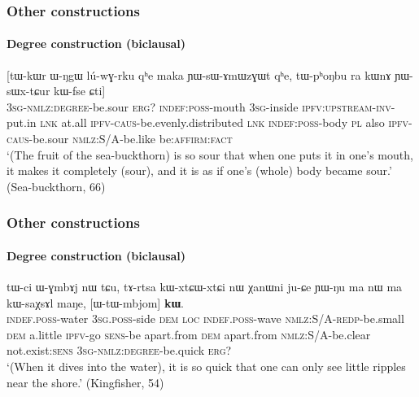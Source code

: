 \documentclass[xcolor=table]{beamer}
\newcommand{\ipa}[1]{{\phon \mbox{#1}}} %
\begin{document}
  \begin{frame} 
 \frametitle{Other constructions} 
 \framesubtitle{Degree construction (biclausal)} 
\begin{exe}
\ex \label{ex:YWsWxtCur2}
\gll 
 	[\ipa{ɯ-tɯ-tɕur}]  	\ipa{\textbf{kɯ}}  	[\ipa{tɯ-kɯr}  	\ipa{ɯ-ŋgɯ}  	\ipa{lú-wɣ-rku}  	\ipa{qʰe}  	\ipa{maka}  	\ipa{ɲɯ-sɯ-ɤmɯzɣɯt}  	\ipa{qʰe,}  	\ipa{tɯ-pʰoŋbu}  	\ipa{ra}  	\ipa{kɯnɤ}  	\ipa{ɲɯ-sɯx-tɕur}  	\ipa{kɯ-fse}  	\ipa{ɕti}]  \\
  \textsc{3sg-nmlz:degree}-be.sour \textsc{erg?} \textsc{indef:poss}-mouth \textsc{3sg}-inside \textsc{ipfv:upstream-inv}-put.in \textsc{lnk} at.all \textsc{ipfv-caus}-be.evenly.distributed \textsc{lnk} \textsc{indef:poss}-body \textsc{pl} also \textsc{ipfv-caus}-be.sour \textsc{nmlz:S/A}-be.like be:\textsc{affirm}:\textsc{fact} \\
\glt `(The fruit of the sea-buckthorn) is so sour that when one puts it in one's mouth, it makes it completely (sour), and it is as if one's (whole) body became sour.' (Sea-buckthorn, 66)
\end{exe}
\end{frame}     


  \begin{frame} 
 \frametitle{Other constructions} 
 \framesubtitle{Degree construction (biclausal)} 

 \begin{exe}
\ex \label{ex:WtWmbjom}
\gll 
\ipa{tɯ-ci}  	\ipa{ɯ-ɣmbɤj}  	\ipa{nɯ}  	\ipa{tɕu,}  	  	\ipa{tɤ-rtsa}  	\ipa{kɯ-xtɕɯ-xtɕi}  	\ipa{nɯ}  	\ipa{χanɯni}  	\ipa{ju-ɕe}  	\ipa{ɲɯ-ŋu}  	\ipa{ma}  	\ipa{nɯ}  	\ipa{ma}  	\ipa{kɯ-saχsɤl}  	\ipa{maŋe,}  	[\ipa{ɯ-tɯ-mbjom}]  	\ipa{\textbf{kɯ}.}  \\
\textsc{indef.poss}-water \textsc{3sg.poss}-side \textsc{dem} \textsc{loc} \textsc{indef.poss}-wave \textsc{nmlz:S/A-redp}-be.small \textsc{dem} a.little \textsc{ipfv}-go \textsc{sens}-be apart.from \textsc{dem} apart.from   \textsc{nmlz:S/A}-be.clear not.exist:\textsc{sens} \textsc{3sg-nmlz:degree}-be.quick \textsc{erg?} \\
\glt `(When it dives into the water), it is so quick that one can only see little ripples near the shore.'
 (Kingfisher, 54)
\end{exe}

\end{frame}     
\end{document}
